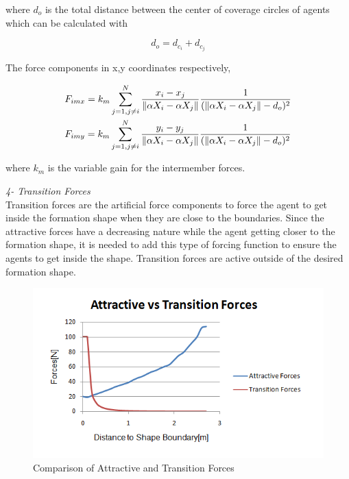where $d_o$ is the total distance between the center of coverage circles of agents which can be calculated with

\begin{equation}
 d_o = d_{c_i} + d_{c_j}
\end{equation}
			
The force components in x,y coordinates respectively,

\begin{align}
\begin{split}
&F_{imx} = k_m \sum_{j=1, j\neq i}^{N}\frac{x_i- x_j}{\left\lVert\alpha X_i - \alpha X_j\right\rVert}  \frac{1}{(\left\lVert\alpha X_i - \alpha X_j\right\rVert - d_o)^2}\\
&F_{imy} = k_m \sum_{j=1, j\neq i}^{N}\frac{y_i- y_j}{\left\lVert\alpha X_i - \alpha X_j\right\rVert}  \frac{1}{(\left\lVert\alpha X_i - \alpha X_j\right\rVert - d_o)^2}\\
\end{split}
\end{align}
		
where $k_m$ is the variable gain for the intermember forces.  \newline
			
\textit{4- Transition Forces} \\ 		
Transition forces are the artificial force components to force the agent to get inside the formation shape when they are close to the boundaries. Since the attractive forces have a decreasing nature while the agent getting closer to the formation shape, it is needed to add this type of forcing function to ensure the agents to get inside the shape. Transition forces are active outside of the desired formation shape.
			
\begin{figure}[H]
\caption{Comparison of Attractive and Transition Forces}
\centering
\includegraphics[scale = 0.80]{transition_forces}
\end{figure}		

